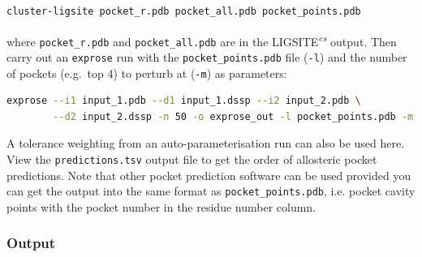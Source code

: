 \begin{lstlisting}[language=bash]
    cluster-ligsite pocket_r.pdb pocket_all.pdb pocket_points.pdb
\end{lstlisting}

where \verb|pocket_r.pdb| and \verb|pocket_all.pdb| are in the LIGSITE\textsuperscript{\it cs} output. Then carry out an \verb|exprose| run with the \verb|pocket_points.pdb| file (\verb|-l|) and the number of pockets (e.g.\ top 4) to perturb at (\verb|-m|) as parameters:

\begin{lstlisting}[language=bash]
    exprose --i1 input_1.pdb --d1 input_1.dssp --i2 input_2.pdb \
        --d2 input_2.dssp -n 50 -o exprose_out -l pocket_points.pdb -m 4
\end{lstlisting}

A tolerance weighting from an auto-parameterisation run can also be used here. View the \verb|predictions.tsv| output file to get the order of allosteric pocket predictions. Note that other pocket prediction software can be used provided you can get the output into the same format as \verb|pocket_points.pdb|, i.e. pocket cavity points with the pocket number in the residue number column.


\subsubsection*{Output}

